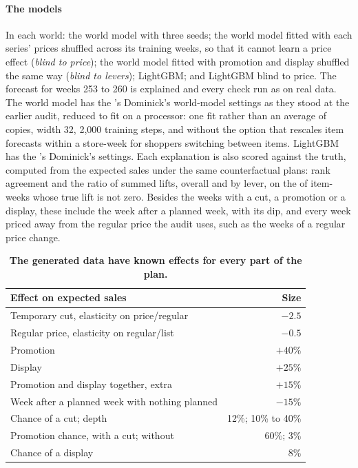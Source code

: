 \paragraph{The models}
In each world: the world model with three seeds; the world model fitted with
each series' prices shuffled across its training weeks, so that it cannot learn
a price effect (\emph{blind to price}); the world model fitted with promotion
and display shuffled the same way (\emph{blind to levers}); LightGBM; and
LightGBM blind to price. The forecast for weeks 253 to 260 is explained and
every check run as on real data. The world model has the \companion{} 's
Dominick's world-model settings as they stood at the earlier audit, reduced to fit
on a processor: one fit rather than an average of copies, width 32, 2,000
training steps, and without the option that rescales item forecasts within a
store-week for shoppers switching between items. LightGBM has the \companion{}
's Dominick's settings. Each explanation is also scored against the
truth, computed from the expected sales under the same counterfactual plans:
rank agreement and the ratio of summed lifts, overall and by lever, on the
\kaPlanned{} of \kaRows{} item-weeks whose true lift is not zero. Besides the
weeks with a cut, a promotion or a display, these include the week after a
planned week, with its dip, and every week priced away from the regular price
the audit uses, such as the weeks of a regular price change.

\begin{table}[t]
\centering
\caption{\textbf{The generated data have known effects for every part of the
plan.}}
\label{tab:knowntruth}
\footnotesize
\begin{tabular}{@{}lr@{}}
\toprule
Effect on expected sales & Size\\
\midrule
Temporary cut, elasticity on price/regular & $-2.5$\\
Regular price, elasticity on regular/list & $-0.5$\\
Promotion & $+40\%$\\
Display & $+25\%$\\
Promotion and display together, extra & $+15\%$\\
Week after a planned week with nothing planned & $-15\%$\\
\midrule
Chance of a cut; depth & 12\%; 10\% to 40\%\\
Promotion chance, with a cut; without & 60\%; 3\%\\
Chance of a display & 8\%\\
\bottomrule
\end{tabular}
\end{table}

